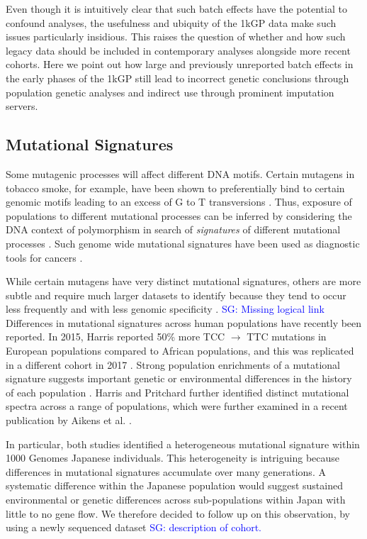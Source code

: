 \documentclass[9pt,lineno]{elife}
\newcommand{\sgcomment}[1]{\textcolor{blue}{SG: #1}}
\begin{document}
Even though it is intuitively clear that such batch effects have the potential to confound analyses, the usefulness and ubiquity of the 1kGP data make such issues particularly insidious.   
This raises the question of whether and how such legacy data should be included in contemporary analyses alongside more recent cohorts.
Here we point out how large and previously unreported batch effects in the early phases of the 1kGP still lead to incorrect genetic conclusions through population genetic analyses and indirect use through prominent imputation servers.


\subsection{Mutational Signatures}

Some mutagenic processes will affect different DNA motifs. 
Certain mutagens in tobacco smoke, for example, have been shown to preferentially bind to certain genomic motifs leading to an excess of G to T transversions \citep{Pfeifer2002,Pleasance2010}. 
Thus, exposure of populations to different mutational processes can be inferred by considering the DNA context of polymorphism in search of \textit{signatures} of different mutational processes \citep{Alexandrov2013,Shiraishi2015a}. 
Such genome wide mutational signatures have been used as diagnostic tools for cancers \citep{Alexandrov2013,Shiraishi2015a}.

While certain mutagens have very distinct mutational signatures, others are more subtle and require much larger datasets to identify because they tend to occur less frequently and with less genomic specificity \citep{Pleasance2010}. \sgcomment{Missing logical link}
Differences in mutational signatures across human populations have recently been reported.
In 2015, Harris reported 50\% more TCC ${\rightarrow}$ TTC mutations in European populations compared to African populations, and this was replicated in a different cohort in 2017 \citep{Harris2015a, Harris2017a, Mathieson2017a}. 
Strong population enrichments of a mutational signature suggests important genetic or environmental differences in the history of each population \citep{Harris2015a, Harris2017a}. 
Harris and Pritchard further identified distinct mutational spectra across a range of populations, which were further examined in a recent publication by Aikens et al. \citep{Harris2017a,Aikens2018}.
 
 In particular, both studies  identified a heterogeneous mutational signature within 1000 Genomes Japanese individuals.
This heterogeneity is intriguing because differences in mutational signatures accumulate over many generations.
A systematic difference within the Japanese population would suggest sustained environmental or genetic differences across sub-populations within Japan with little to no gene flow.
We therefore decided to follow up on this observation, by using a newly sequenced dataset \sgcomment{description of cohort.}
\end{document}
